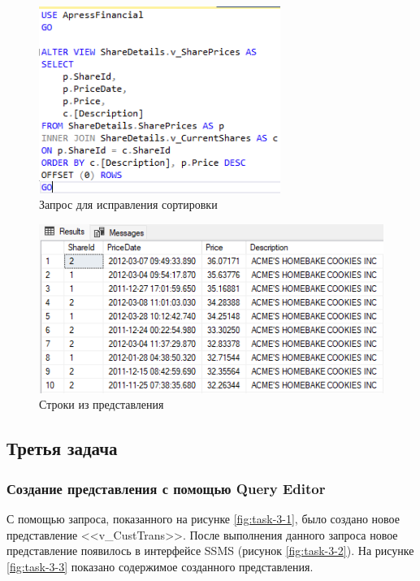 \documentclass[a4paper, 14pt]{extarticle}
\begin{document}
\begin{figure}[H]
  \centering
  \includegraphics[width=0.7\textwidth]{images/task-2/11.png}
  \caption{Запрос для исправления сортировки}
  \label{fig:task-2-11}
\end{figure}

\begin{figure}[H]
  \centering
  \includegraphics[width=\textwidth]{images/task-2/12.png}
  \caption{Строки из представления}
  \label{fig:task-2-12}
\end{figure}

\subsection{Третья задача}

\subsubsection{Создание представления с помощью Query Editor}

С помощью запроса, показанного на рисунке \ref{fig:task-3-1}, было создано новое
представление <<\foreignlanguage{english}{v\_CustTrans}>>. После выполнения
данного запроса новое представление появилось в интерфейсе SSMS (рисунок
\ref{fig:task-3-2}). На рисунке \ref{fig:task-3-3} показано содержимое
созданного представления.
\end{document}
